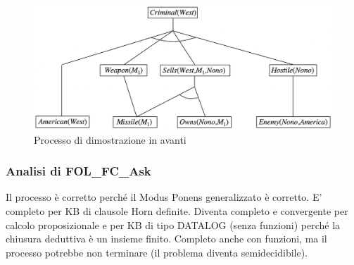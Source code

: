 \documentclass{article}
\begin{document}
\begin{figure}[H]
\centering
\includegraphics[scale=0.4]{Images/FC-fol-ask.png}
\caption{Processo di dimostrazione in avanti}
\end{figure}

\subsubsection{Analisi di FOL\_FC\_Ask}
Il processo è corretto perché il Modus Ponens generalizzato è corretto. E' completo per KB di clausole Horn definite. Diventa completo e convergente per calcolo proposizionale e per KB di tipo DATALOG (senza funzioni) perché la chiusura deduttiva è un insieme finito. Completo anche con funzioni, ma il processo potrebbe non terminare (il problema diventa semidecidibile).




































%
%
\end{document}
